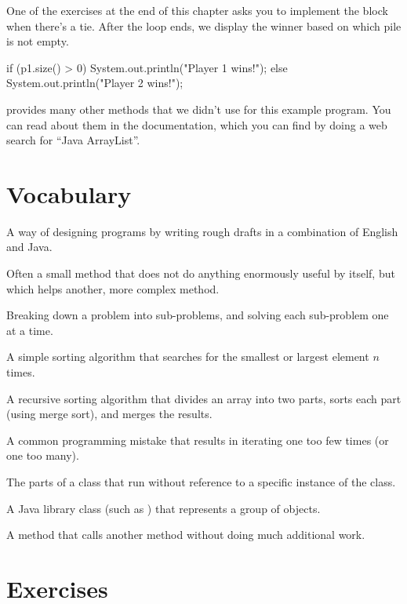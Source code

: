 One of the exercises at the end of this chapter asks you to implement the  block when there's a tie.
After the  loop ends, we display the winner based on which pile is not empty.

\begin{code}
if (p1.size() > 0) {
    System.out.println("Player 1 wins!");
} else {
    System.out.println("Player 2 wins!");
}
\end{code}

 provides many other methods that we didn't use for this example program.
You can read about them in the documentation, which you can find by doing a web search for ``Java ArrayList''.


\section{Vocabulary}

\begin{description}

A way of designing programs by writing rough drafts in a combination of English and Java.

Often a small method that does not do anything enormously useful by itself, but which helps another, more complex method.

Breaking down a problem into sub-problems, and solving each sub-problem one at a time.

A simple sorting algorithm that searches for the smallest or largest element $n$ times.

A recursive sorting algorithm that divides an array into two parts, sorts each part (using merge sort), and merges the results.

A common programming mistake that results in iterating one too few times (or one too many).

The parts of a class that run without reference to a specific instance of the class.

A Java library class (such as ) that represents a group of objects.

A method that calls another method without doing much additional work.

\end{description}


\section{Exercises}

